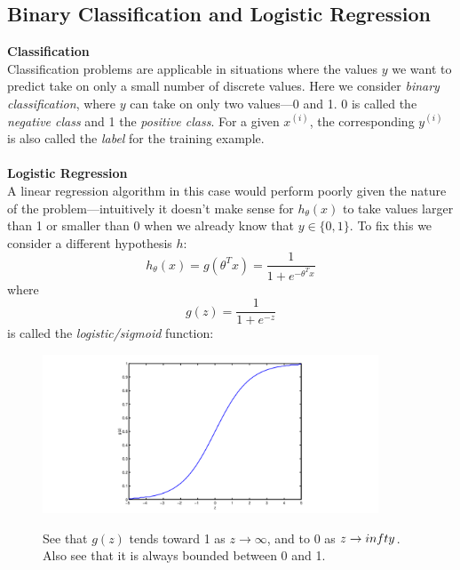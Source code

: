 \documentclass{report}
\begin{document}
\subsection{Binary Classification and Logistic Regression}
\textbf{Classification}\\
Classification problems are applicable in situations where the values $y$ we want to predict
take on only a small number of discrete values. Here we consider \textit{binary classification}, where 
$y$ can take on only two values---0 and 1. 0 is called
the \textit{negative class} and 1 the \textit{positive class}. For a given $x^{(i)}$, the corresponding 
$y^{(i)}$ is also called the \textit{label} for the training example.\\
\vspace{1mm}\\
\textbf{Logistic Regression}\\
A linear regression algorithm in this case would perform poorly given the nature of the problem---intuitively
it doesn't make sense for $h_\theta(x)$ to take values larger than 1 or smaller than 0 when
we already know that $y\in\{0,1\}$. To fix this we consider a different hypothesis $h$:
\begin{equation*}
h_\theta(x)=g(\theta^Tx)=\frac{1}{1+e^{-\theta^Tx}}
\end{equation*}
where 
\begin{equation*}
g(z)=\frac{1}{1+e^{-z}}
\end{equation*}
is called the \textit{logistic/sigmoid} function:
\begin{figure}[h]
\begin{center}
\includegraphics[width=10cm]{1}\\
\end{center}
See that $g(z)$ tends toward 1 as $z\to\infty$, and to 0 as $z\to\-infty$. Also see
that it is always bounded between 0 and 1.
\end{figure}
\end{document}
